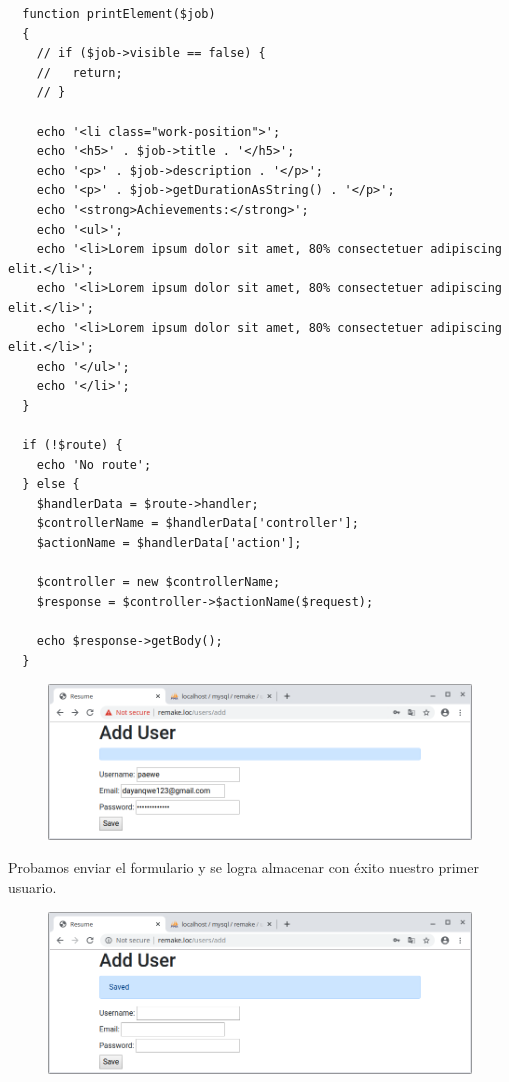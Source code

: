 \documentclass{article}
\begin{document}
\begin{verbatim}
  function printElement($job)
  {
    // if ($job->visible == false) {
    //   return;
    // }

    echo '<li class="work-position">';
    echo '<h5>' . $job->title . '</h5>';
    echo '<p>' . $job->description . '</p>';
    echo '<p>' . $job->getDurationAsString() . '</p>';
    echo '<strong>Achievements:</strong>';
    echo '<ul>';
    echo '<li>Lorem ipsum dolor sit amet, 80% consectetuer adipiscing elit.</li>';
    echo '<li>Lorem ipsum dolor sit amet, 80% consectetuer adipiscing elit.</li>';
    echo '<li>Lorem ipsum dolor sit amet, 80% consectetuer adipiscing elit.</li>';
    echo '</ul>';
    echo '</li>';
  }

  if (!$route) {
    echo 'No route';
  } else {
    $handlerData = $route->handler;
    $controllerName = $handlerData['controller'];
    $actionName = $handlerData['action'];

    $controller = new $controllerName;
    $response = $controller->$actionName($request);

    echo $response->getBody();
  }
\end{verbatim}

\begin{figure}[h!]
  \centering
  \includegraphics[scale=0.5]{./Pictures/195_add_user.png}
\end{figure}

Probamos enviar el formulario y se logra almacenar con éxito nuestro primer
usuario.\\

\begin{figure}[h!]
  \centering
  \includegraphics[scale=0.5]{./Pictures/196_add_user_ok.png}
\end{figure}
\end{document}
